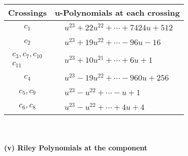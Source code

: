 \documentclass[1p]{elsarticle_modified}
\theoremstyle{definition}
\begin{document}
\begin{tabular}{m{50pt}|m{274pt}}
Crossings & \hspace{64pt}u-Polynomials at each crossing \\
\hline $$\begin{aligned}c_{1}\end{aligned}$$&$\begin{aligned}
&u^{23}+22 u^{22}+\cdots+7424 u+512
\end{aligned}$\\
\hline $$\begin{aligned}c_{2}\end{aligned}$$&$\begin{aligned}
&u^{23}+19 u^{22}+\cdots-96 u-16
\end{aligned}$\\
\hline $$\begin{aligned}c_{3},c_{7},c_{10}\\c_{11}\end{aligned}$$&$\begin{aligned}
&u^{23}+10 u^{21}+\cdots+6 u+1
\end{aligned}$\\
\hline $$\begin{aligned}c_{4}\end{aligned}$$&$\begin{aligned}
&u^{23}-19 u^{22}+\cdots-960 u+256
\end{aligned}$\\
\hline $$\begin{aligned}c_{5},c_{9}\end{aligned}$$&$\begin{aligned}
&u^{23}- u^{22}+\cdots- u+1
\end{aligned}$\\
\hline $$\begin{aligned}c_{6},c_{8}\end{aligned}$$&$\begin{aligned}
&u^{23}- u^{22}+\cdots+4 u+4
\end{aligned}$\\
\hline
\end{tabular}\\~\\
\newpage\renewcommand{\arraystretch}{1}
\flushleft \textbf{(v) Riley Polynomials at the component}\newline \\
\end{document}
